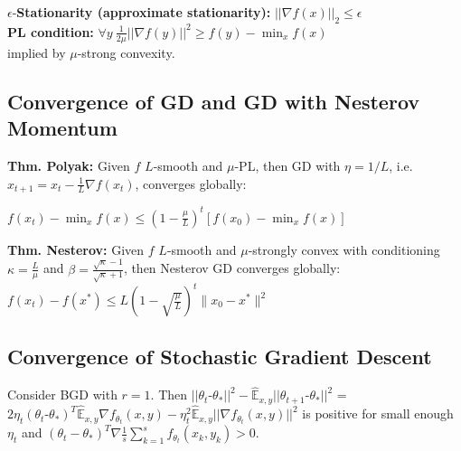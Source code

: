 \hfill {}

\\
\\
$\epsilon$-\textbf{Stationarity (approximate stationarity):} $||\nabla f(x)||_2\leq\epsilon$\\
\textbf{PL condition:}
 $\forall y\ \frac{1}{2 \mu}||\nabla f(y)||^2\geq f(y)-\min_x f(x)$\\
 implied by $\mu$-strong convexity.

\subsection*{Convergence of GD and GD with Nesterov Momentum}
\textbf{Thm. Polyak:} Given $f$ $L$-smooth and $\mu$-PL, then GD with $\eta = 1/L$, i.e. $x_{t+1} = x_t - \frac{1}{L} \nabla f(x_t)$, converges globally:

\hspace{25pt} $f(x_t) - \min_x f(x) \leq (1-\frac{\mu}{L})^t [f(x_0) - \min_x f(x)]$

\textbf{Thm. Nesterov:} Given $f$ $L$-smooth and $\mu$-strongly convex with conditioning $\kappa = \frac{L}{\mu}$ and $\beta = \tfrac{\sqrt{\kappa}-1}{\sqrt{\kappa}+1}$, then Nesterov GD converges globally: $f(x_t)-f(x^*)\leq L(1- \sqrt{\tfrac{\mu}{L}})^t\|x_0-x^*\|^2$\\

\subsection*{Convergence of Stochastic Gradient Descent}
Consider BGD with $r=1$. Then
$||\theta_t \text{-} \theta_*||^2 - \hat{\mathbb{E}}_{x,y} ||\theta_{t+1} \text{-} \theta_*||^2$ = $2 \eta_t (\theta_t \text{-} \theta_*)^T \hat{\mathbb E}_{x,y} \nabla f_{\theta_t}(x, y) - \eta_t^2 \hat{\mathbb E}_{x,y} ||\nabla f_{\theta_t}(x, y)||^2$ is positive for small enough $\eta_t$ and $(\theta_t - \theta_*)^T \nabla \frac{1}{s}\sum_{k=1}^s f_{\theta_t}(x_k, y_k) > 0$.

